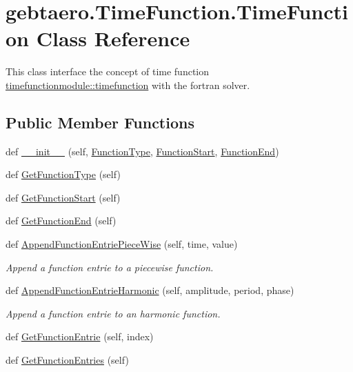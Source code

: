 \hypertarget{classgebtaero_1_1_time_function_1_1_time_function}{}\section{gebtaero.\+Time\+Function.\+Time\+Function Class Reference}
\label{classgebtaero_1_1_time_function_1_1_time_function}


This class interface the concept of time function \hyperlink{structtimefunctionmodule_1_1timefunction}{timefunctionmodule\+::timefunction} with the fortran solver.  


\subsection*{Public Member Functions}
\begin{DoxyCompactItemize}
\item 
def \hyperlink{classgebtaero_1_1_time_function_1_1_time_function_a5f3a6ae6418be0f44d7a549af4a3f339}{\+\_\+\+\_\+init\+\_\+\+\_\+} (self, \hyperlink{classgebtaero_1_1_time_function_1_1_time_function_a71eb6968c49304736305aee5c1e37d51}{Function\+Type}, \hyperlink{classgebtaero_1_1_time_function_1_1_time_function_acd9020ddfc729ecc704fa0c246c2e903}{Function\+Start}, \hyperlink{classgebtaero_1_1_time_function_1_1_time_function_a21c1d719341196b82dd2def3400dd832}{Function\+End})
\item 
def \hyperlink{classgebtaero_1_1_time_function_1_1_time_function_a8dc2ddec757f586a51e250592b35c542}{Get\+Function\+Type} (self)
\item 
def \hyperlink{classgebtaero_1_1_time_function_1_1_time_function_a0ac4b6ccaaa06bb59697d195c213a23e}{Get\+Function\+Start} (self)
\item 
def \hyperlink{classgebtaero_1_1_time_function_1_1_time_function_afd4cbf5dab2375296785f178369bd16c}{Get\+Function\+End} (self)
\item 
def \hyperlink{classgebtaero_1_1_time_function_1_1_time_function_afa29c862ffe8297dbbea0aabaf8f5a08}{Append\+Function\+Entrie\+Piece\+Wise} (self, time, value)
\begin{DoxyCompactList}\small\item\em Append a function entrie to a piecewise function. \end{DoxyCompactList}\item 
def \hyperlink{classgebtaero_1_1_time_function_1_1_time_function_a8e4d81106458219357606a349486c2e6}{Append\+Function\+Entrie\+Harmonic} (self, amplitude, period, phase)
\begin{DoxyCompactList}\small\item\em Append a function entrie to an harmonic function. \end{DoxyCompactList}\item 
def \hyperlink{classgebtaero_1_1_time_function_1_1_time_function_ad72311bf84c87fe3af022735cdba6b6e}{Get\+Function\+Entrie} (self, index)
\item 
def \hyperlink{classgebtaero_1_1_time_function_1_1_time_function_aa37de4ed1aaf0c0f753582c3baee08fe}{Get\+Function\+Entries} (self)
\end{DoxyCompactItemize}
